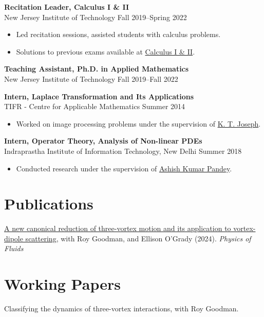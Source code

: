 \documentclass[11pt,a4paper]{article}
\begin{document}
\textbf{Recitation Leader, Calculus I \& II} \\
New Jersey Institute of Technology \hfill
Fall 2019--Spring 2022 
\begin{itemize}[noitemsep]
    \item Led recitation sessions, assisted students with calculus problems.
    \item Solutions to previous exams available at \href{https://atulanurag.com/teaching/}{Calculus I \& II}.
\end{itemize}

\textbf{Teaching Assistant, Ph.D. in Applied Mathematics} \\
New Jersey Institute of Technology \hfill
Fall 2019--Fall 2022


\textbf{Intern, Laplace Transformation and Its Applications} \\
TIFR - Centre for Applicable Mathematics \hfill
Summer 2014 
\begin{itemize}[noitemsep]
    \item Worked on image processing problems under the supervision of \href{https://scholar.google.co.in/citations?user=R18BdvYAAAAJ&hl=en}{K. T. Joseph}.
\end{itemize}

\textbf{Intern, Operator Theory, Analysis of Non-linear PDEs} \\
Indraprastha Institute of Information Technology, New Delhi\hfill
Summer 2018 
\begin{itemize}[noitemsep]
    \item Conducted research under the supervision of \href{https://sites.google.com/iiitd.ac.in/akpandey/home}{Ashish Kumar Pandey}.
\end{itemize}

\vspace{10pt}

\section*{Publications}

\href{https://arxiv.org/abs/2403.10383}{A new canonical reduction of three-vortex motion and its application to vortex-dipole scattering}, with Roy Goodman, and Ellison O'Grady (2024). \emph{Physics of Fluids}

\vspace{10pt}

\section*{Working Papers}
Classifying the dynamics of three-vortex interactions, with Roy Goodman.
\end{document}
